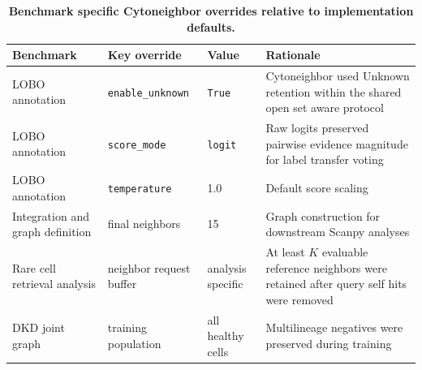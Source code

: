 \documentclass[11pt]{article}
\begin{document}
\begin{table}[htbp]
\centering
\caption{\textbf{Benchmark specific Cytoneighbor overrides relative to implementation defaults.}}
\label{tab:s5_overrides}
\scriptsize
\begin{tabularx}{\textwidth}{@{}L{0.20\textwidth} L{0.22\textwidth} L{0.22\textwidth} Y@{}}
\toprule
\textbf{Benchmark} & \textbf{Key override} & \textbf{Value} & \textbf{Rationale} \\
\midrule
LOBO annotation & \texttt{enable\_unknown} & \texttt{True} & Cytoneighbor used Unknown retention within the shared open set aware protocol \\
LOBO annotation & \texttt{score\_mode} & \texttt{logit} & Raw logits preserved pairwise evidence magnitude for label transfer voting \\
LOBO annotation & \texttt{temperature} & 1.0 & Default score scaling \\
Integration and graph definition & final neighbors & 15 & Graph construction for downstream Scanpy analyses \\
Rare cell retrieval analysis & neighbor request buffer & analysis specific & At least \(K\) evaluable reference neighbors were retained after query self hits were removed \\
DKD joint graph & training population & all healthy cells & Multilineage negatives were preserved during training \\
\bottomrule
\end{tabularx}
\end{table}

\FloatBarrier
\end{document}
